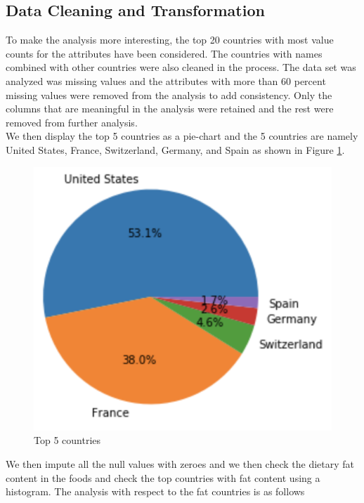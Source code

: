 \documentclass[sigconf]{acmart}
\begin{document}
\subsection{Data Cleaning and Transformation}
To make the analysis more interesting, the top 20 countries with most value counts for the attributes have been considered. The countries with names combined with other countries were also cleaned in the process. The data set was analyzed was missing values and the attributes with more than 60 percent missing values were removed from the analysis to add consistency. Only the columns that are meaningful in the analysis were retained and the rest were removed from further analysis. \\

We then display the top 5 countries as a pie-chart and the 5 countries are namely United States, France, Switzerland, Germany, and Spain as shown in Figure \ref{fig:Fig7}. 

\begin{figure}
\includegraphics[width=1.0\columnwidth]{images/fig7.png}
\caption{Top 5 countries \cite{code-base}}
\label{fig:Fig7}
\end{figure}

We then impute all the null values with zeroes and we then check the dietary fat content in the foods and check the top countries with fat content using a histogram. The analysis with respect to the fat countries is as follows \\
\end{document}
